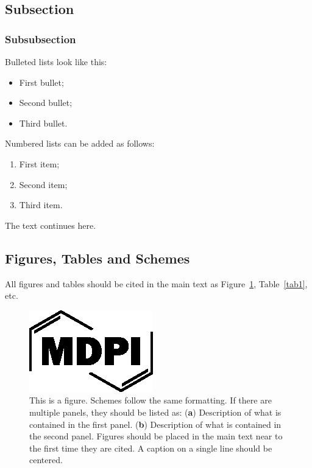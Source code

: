 \documentclass[entropy,article,submit,pdftex,moreauthors]{Definitions/mdpi}
\begin{document}
\subsection{Subsection}
\subsubsection{Subsubsection}

Bulleted lists look like this:
\begin{itemize}
\item	First bullet;
\item	Second bullet;
\item	Third bullet.
\end{itemize}

Numbered lists can be added as follows:
\begin{enumerate}
\item	First item; 
\item	Second item;
\item	Third item.
\end{enumerate}

The text continues here. 

\subsection{Figures, Tables and Schemes}

All figures and tables should be cited in the main text as Figure~\ref{fig1}, Table~\ref{tab1}, etc.

\begin{figure}[H]
\includegraphics[width=10.5 cm]{Definitions/logo-mdpi}
\caption{This is a figure. Schemes follow the same formatting. If there are multiple panels, they should be listed as: (\textbf{a}) Description of what is contained in the first panel. (\textbf{b}) Description of what is contained in the second panel. Figures should be placed in the main text near to the first time they are cited. A caption on a single line should be centered.\label{fig1}}
\end{figure}   
\unskip
\end{document}
